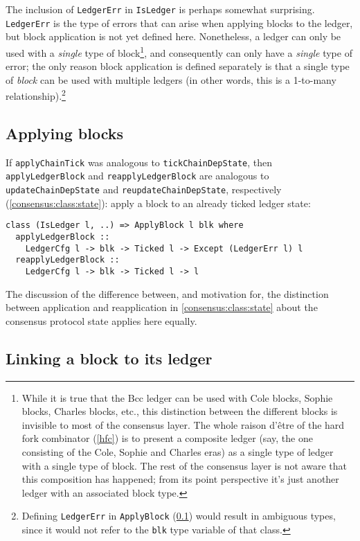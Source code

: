 The inclusion of \lstinline!LedgerErr! in \lstinline!IsLedger! is perhaps
somewhat surprising. \lstinline!LedgerErr! is the type of errors that can arise
when applying blocks to the ledger, but block application is not yet defined
here. Nonetheless, a ledger can only be used with a \emph{single} type of
block\footnote{While it is true that the Bcc ledger can be used with Cole
blocks, Sophie blocks, Charles blocks, etc., this distinction between the
different blocks is invisible to most of the consensus layer. The whole raison
d'\^{e}tre of the hard fork combinator (\cref{hfc}) is to present a composite
ledger (say, the one consisting of the Cole, Sophie and Charles eras) as a
single type of ledger with a single type of block. The rest of the consensus
layer is not aware that this composition has happened; from its point
perspective it's just another ledger with an associated block type.}, and
consequently can only have a \emph{single} type of error; the only reason block
application is defined separately is that a single type of \emph{block} can be
used with multiple ledgers (in other words, this is a 1-to-many
relationship).\footnote{Defining \lstinline!LedgerErr! in \lstinline!ApplyBlock!
(\cref{ledger:api:ApplyBlock}) would result in ambiguous types, since it would
not refer to the \lstinline!blk! type variable of that class.}

\subsection{Applying blocks}
\label{ledger:api:ApplyBlock}

If \lstinline!applyChainTick! was analogous to \lstinline!tickChainDepState!,
then \lstinline!applyLedgerBlock! and \lstinline!reapplyLedgerBlock! are
analogous to \lstinline!updateChainDepState! and
\lstinline!reupdateChainDepState!, respectively
(\cref{consensus:class:state}): apply a block to an already ticked
ledger state:
%
\begin{lstlisting}
class (IsLedger l, ..) => ApplyBlock l blk where
  applyLedgerBlock ::
    LedgerCfg l -> blk -> Ticked l -> Except (LedgerErr l) l
  reapplyLedgerBlock ::
    LedgerCfg l -> blk -> Ticked l -> l
\end{lstlisting}
%
The discussion of the difference between, and motivation for, the distinction
between application and reapplication in \cref{consensus:class:state}
about the consensus protocol state applies here equally.

\subsection{Linking a block to its ledger}

